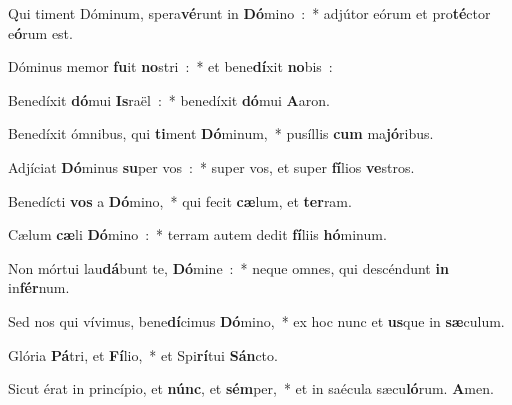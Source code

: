 \item Qui timent Dóminum, spera\textbf{vé}\-runt in \textbf{Dó}\-mino~:~* adjútor eórum et pro\textbf{té}\-ctor e\textbf{ó}\-rum est.
\item Dóminus memor \textbf{fu}\-it \textbf{no}\-stri~:~* et bene\textbf{dí}\-xit \textbf{no}\-bis~:
\item Benedíxit \textbf{dó}\-mui \textbf{Is}\-raël~:~* benedíxit \textbf{dó}\-mui \textbf{A}\-aron.
\item Benedíxit ómnibus, qui \textbf{ti}\-ment \textbf{Dó}\-minum,~* pu\-síl\-lis \textbf{cum} ma\textbf{jó}\-ribus.
\item Adjíciat \textbf{Dó}\-minus \textbf{su}\-per vos~:~* super vos, et super \textbf{fí}\-li\-os \textbf{ve}\-stros.
\item Benedícti \textbf{vos} a \textbf{Dó}\-mino,~* qui fecit \textbf{cæ}\-lum, et \textbf{ter}\-ram.
\item Cælum \textbf{cæ}\-li \textbf{Dó}\-mino~:~* terram autem dedit \textbf{fí}\-liis \textbf{hó}\-mi\-num.
\item Non mórtui lau\textbf{dá}\-bunt te, \textbf{Dó}\-mine~:~* neque omnes, qui descéndunt \textbf{in} in\textbf{fér}\-num.
\item Sed nos qui vívimus, bene\textbf{dí}\-cimus \textbf{Dó}\-mino,~* ex hoc nunc et \textbf{us}\-que in \textbf{sæ}\-culum.
\item Glória \textbf{Pá}\-tri, et \textbf{Fí}\-lio,~* et Spi\textbf{rí}\-tui \textbf{Sán}\-cto.
\item Sicut érat in princípio, et \textbf{núnc}, et \textbf{sém}\-per,~* et in saé\-cu\-la sæcu\textbf{ló}\-rum. \textbf{A}\-men.
